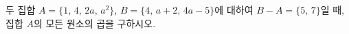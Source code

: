 두 집합 $A=\{1,\,4,\,2a,\,a^2\}$, $B=\{4,\,a+2,\,4a-5\}$에 대하여 $B-A=\{5,\,7\}$일 때, 집합 $A$의 모든 원소의 곱을 구하시오. 
